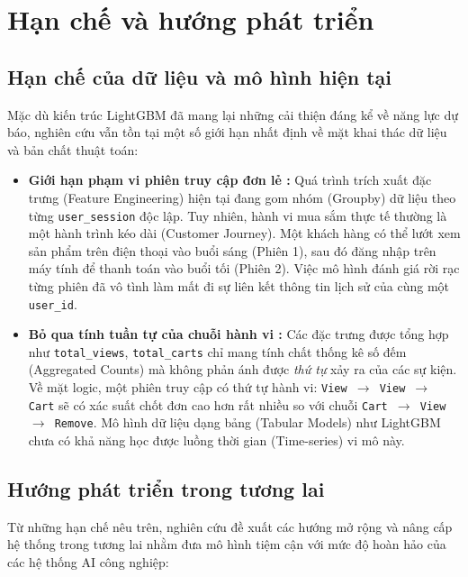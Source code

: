 \documentclass[a4paper,11pt]{article}
\begin{document}
\section{Hạn chế và hướng phát triển}
\subsection{Hạn chế của dữ liệu và mô hình hiện tại }
Mặc dù kiến trúc LightGBM đã mang lại những cải thiện đáng kể về năng lực dự báo, nghiên cứu vẫn tồn tại một số giới hạn nhất định về mặt khai thác dữ liệu và bản chất thuật toán:

\begin{itemize}[itemsep=4pt, leftmargin=*]
    \item \textbf{Giới hạn phạm vi phiên truy cập đơn lẻ :} 
    Quá trình trích xuất đặc trưng (Feature Engineering) hiện tại đang gom nhóm (Groupby) dữ liệu theo từng \texttt{user\_session} độc lập. Tuy nhiên, hành vi mua sắm thực tế thường là một hành trình kéo dài (Customer Journey). Một khách hàng có thể lướt xem sản phẩm trên điện thoại vào buổi sáng (Phiên 1), sau đó đăng nhập trên máy tính để thanh toán vào buổi tối (Phiên 2). Việc mô hình đánh giá rời rạc từng phiên đã vô tình làm mất đi sự liên kết thông tin lịch sử của cùng một \texttt{user\_id}.
    
    \item \textbf{Bỏ qua tính tuần tự của chuỗi hành vi :} 
    Các đặc trưng được tổng hợp như \texttt{total\_views}, \texttt{total\_carts} chỉ mang tính chất thống kê số đếm (Aggregated Counts) mà không phản ánh được \textit{thứ tự} xảy ra của các sự kiện. Về mặt logic, một phiên truy cập có thứ tự hành vi: \texttt{View $\rightarrow$ View $\rightarrow$ Cart} sẽ có xác suất chốt đơn cao hơn rất nhiều so với chuỗi \texttt{Cart $\rightarrow$ View $\rightarrow$ Remove}. Mô hình dữ liệu dạng bảng (Tabular Models) như LightGBM chưa có khả năng học được luồng thời gian (Time-series) vi mô này.
    
\end{itemize}

\subsection{Hướng phát triển trong tương lai }
Từ những hạn chế nêu trên, nghiên cứu đề xuất các hướng mở rộng và nâng cấp hệ thống trong tương lai nhằm đưa mô hình tiệm cận với mức độ hoàn hảo của các hệ thống AI công nghiệp:
\end{document}
